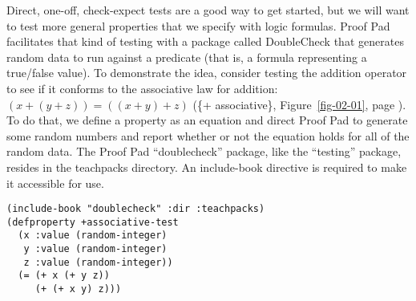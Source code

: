 Direct, one-off, \textsf{check-expect} tests
are a good way to get started, but
we will want to test more general properties that we specify with logic formulas.
Proof Pad facilitates that kind of testing
with a package called
DoubleCheck
that generates
random data
to run against a predicate
(that is, a formula representing a true/false value).
To demonstrate the idea, consider testing the addition operator to see if
it conforms to the associative law for addition: $(x + (y + z)) = ((x + y) + z)$
(\{+ associative\}, Figure~\ref{fig-02-01}, page \pageref{fig-02-01}).
To do that, we define a property as an equation
and direct Proof Pad to generate some random numbers and
report whether or not the equation holds for all of the random data.
The Proof Pad ``doublecheck'' package,
like the ``testing'' package,
resides in the
teachpacks directory.
An \textsf{include-book} directive is required to make it accessible for use.

\begin{code}
\begin{verbatim}
(include-book "doublecheck" :dir :teachpacks)
(defproperty +associative-test
  (x :value (random-integer)
   y :value (random-integer)
   z :value (random-integer))
  (= (+ x (+ y z))
     (+ (+ x y) z)))
\end{verbatim}
\end{code}

